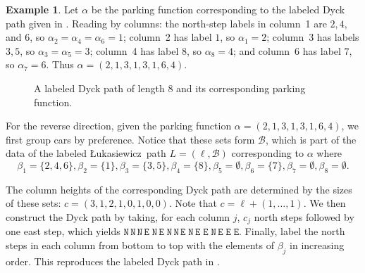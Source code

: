 \documentclass[12pt,reqno]{amsart}
\theoremstyle{definition}
\newtheorem{example}{Example}
\theoremstyle{remark}
\newcommand{\North}{\texttt{N}}
\newcommand{\East}{\texttt{E}}
\newcommand{\Luka}{\L ukasiewicz}
\newcommand{\tb}[1]{{\bf\color{blue}{#1}}}
\begin{document}
\begin{example}
  Let $\alpha$ be the parking function corresponding to the labeled Dyck path given in .
Reading by columns: the north-step labels in column~1 are $2,4,$ and $6$, so $\alpha_2=\alpha_4=\alpha_6=1$; 
column~2 has label $1$, so $\alpha_1=2$; 
column~3 has labels $3,5$, so $\alpha_3=\alpha_5=3$; 
column~4 has label $8$, so $\alpha_8=4$; 
and column~6 has label $7$, so $\alpha_7=6$.
Thus \(\alpha=(2,1,3,1,3,1,6,4).\)

  \begin{figure}[H]
        \centering
        \caption{A labeled Dyck path of length $8$ and its corresponding parking function.}
        \label{fig:Dyck}
    \end{figure}
For the reverse direction, given the parking function $\alpha=(2,1,3,1,3,1,6,4)$,  
we first group cars by preference.  
Notice that these sets form $\mathcal{B}$, which is part of the data of the labeled \Luka~path $L=(\ell,\mathcal{B})$ corresponding to $\alpha$ where
\[
\beta_1=\{2,4,6\},
\beta_2=\{1\},
\beta_3=\{3,5\},
\beta_4=\{8\},
\beta_5=\emptyset,
\beta_6=\{7\},
\beta_7=\emptyset,
\beta_8=\emptyset.
\]
  
The column heights of the corresponding Dyck path are determined by the sizes of these sets:
\(c = (3,1,2,1,0,1,0,0)\). Note that  
$c = \ell + (1,\ldots,1)$.  
We then construct the Dyck path by taking, for each column $j$, $c_j$ north steps followed by one east step, which yields
\(
\North\,\North\,\North\,\East\;
\North\,\East\;
\North\,\North\,\East\;
\North\,\East\;
\East\;
\North\,\East\;
\East\;
\East.
\)
Finally, label the north steps in each column from bottom to top with the elements of $\beta_j$ in increasing order. This reproduces the labeled Dyck path in .
\end{example}
\end{document}
